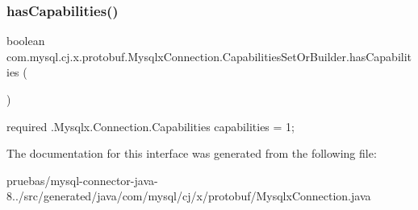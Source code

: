 \subsubsection{\texorpdfstring{has\+Capabilities()}{hasCapabilities()}}
{\footnotesize\ttfamily boolean com.\+mysql.\+cj.\+x.\+protobuf.\+Mysqlx\+Connection.\+Capabilities\+Set\+Or\+Builder.\+has\+Capabilities (\begin{DoxyParamCaption}{ }\end{DoxyParamCaption})}

{\ttfamily required .Mysqlx.\+Connection.\+Capabilities capabilities = 1;} 

The documentation for this interface was generated from the following file\+:\begin{DoxyCompactItemize}
\item 
pruebas/mysql-\/connector-\/java-\/8../src/generated/java/com/mysql/cj/x/protobuf/Mysqlx\+Connection.\+java\end{DoxyCompactItemize}
